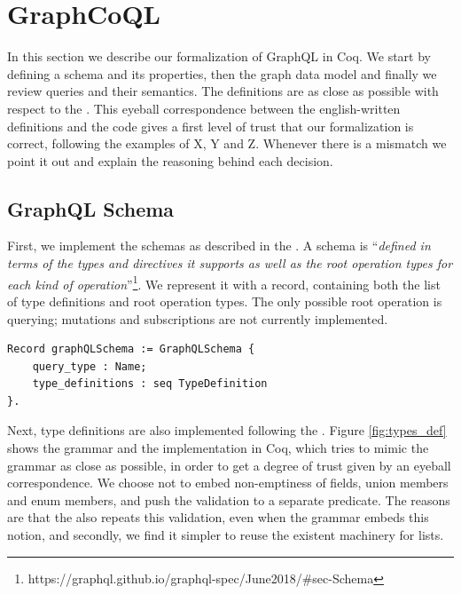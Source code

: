 \section{GraphCoQL}\label{sec:form}

In this section we describe our formalization of GraphQL in Coq. We start by defining a schema and its properties, then the graph data model and finally we review queries and their semantics. The definitions are as close as possible with respect to the \spec{}. This eyeball correspondence between the english-written definitions and the code gives a first level of trust that our formalization is correct, following the examples of X, Y and Z. Whenever there is a mismatch we point it out and explain the reasoning behind each decision.


\subsection{GraphQL Schema}\label{subsec:schema}

First, we implement the schemas as described in the \spec{}.  A schema is ``\textit{defined in terms of the types and directives it supports as well as the root operation types for each kind of operation}''\footnote{https://graphql.github.io/graphql-spec/June2018/\#sec-Schema}. 
We represent it with a record, containing both the list of type definitions and root operation types.  The only possible root operation is querying; mutations and subscriptions are not currently implemented. 

\begin{verbatim}
Record graphQLSchema := GraphQLSchema {
    query_type : Name;
    type_definitions : seq TypeDefinition
}.
\end{verbatim}

Next, type definitions are also implemented following the \spec{}. Figure \ref{fig:types_def} shows the grammar and the implementation in Coq, which tries to mimic the grammar as close as possible, in order to get a degree of trust given by an eyeball correspondence. We choose not to embed non-emptiness of fields, union members and enum members, and push the validation to a separate predicate. The reasons are that the \spec{} also repeats this validation, even when the grammar embeds this notion, and secondly, we find it simpler to reuse the existent machinery for lists.

